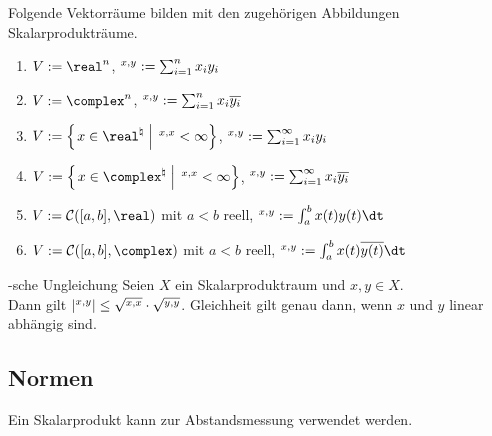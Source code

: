 \begin{Bsp}
    Folgende Vektorräume bilden mit den zugehörigen Abbildungen Skalarprodukträume.
    \begin{enumerate}[label=\emph{(\alph*)}]
        \item
        $V := \real^n$, $\sp{x, y} := \sum_{i=1}^n x_i y_i$
        
        \item
        $V := \complex^n$, $\sp{x, y} := \sum_{i=1}^n x_i \overline{y_i}$
        
        \item
        $V := \left\{\left.x \in \real^\natural \;\right|\; \sp{x, x} < \infty\right\}$,
        $\sp{x, y} := \sum_{i=1}^\infty x_i y_i$
        
        \item
        $V := \left\{\left.x \in \complex^\natural \;\right|\; \sp{x, x} < \infty\right\}$,
        $\sp{x, y} := \sum_{i=1}^\infty x_i \overline{y_i}$
        
        \item
        $V := \C([a,b], \real)$ mit $a < b$ reell, $\sp{x, y} := \int_a^b x(t)y(t)\dt$
        
        \item
        $V := \C([a,b], \complex)$ mit $a < b$ reell, $\sp{x, y} := \int_a^b x(t)\kk{y(t)}\dt$
    \end{enumerate}
\end{Bsp}

\begin{Satz}{-sche Ungleichung}
    Seien $X$ ein Skalarproduktraum und $x, y \in X$.\\
    Dann gilt $|\sp{x, y}| \le \sqrt{\sp{x, x}} \cdot \sqrt{\sp{y, y}}$.
    Gleichheit gilt genau dann, wenn $x$ und $y$ linear abhängig sind.
\end{Satz}

\subsection{%
    Normen%
}

\begin{Bem}
    Ein Skalarprodukt kann zur Abstandsmessung verwendet werden.
\end{Bem}

